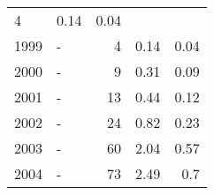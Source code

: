 \begin{longtable}{lXrrr}
       \num{4} &
       \num[round-mode=places,round-precision=2]{0.14} &
         \num[round-mode=places,round-precision=2]{0.04} \\

     1999 &
     \multicolumn{1}{X}{ -  } &


       \num{4} &
       \num[round-mode=places,round-precision=2]{0.14} &
         \num[round-mode=places,round-precision=2]{0.04} \\

     2000 &
     \multicolumn{1}{X}{ -  } &


       \num{9} &
       \num[round-mode=places,round-precision=2]{0.31} &
         \num[round-mode=places,round-precision=2]{0.09} \\

     2001 &
     \multicolumn{1}{X}{ -  } &


       \num{13} &
       \num[round-mode=places,round-precision=2]{0.44} &
         \num[round-mode=places,round-precision=2]{0.12} \\

     2002 &
     \multicolumn{1}{X}{ -  } &


       \num{24} &
       \num[round-mode=places,round-precision=2]{0.82} &
         \num[round-mode=places,round-precision=2]{0.23} \\

     2003 &
     \multicolumn{1}{X}{ -  } &


       \num{60} &
       \num[round-mode=places,round-precision=2]{2.04} &
         \num[round-mode=places,round-precision=2]{0.57} \\

     2004 &
     \multicolumn{1}{X}{ -  } &


       \num{73} &
       \num[round-mode=places,round-precision=2]{2.49} &
         \num[round-mode=places,round-precision=2]{0.7} \\


\end{longtable}
